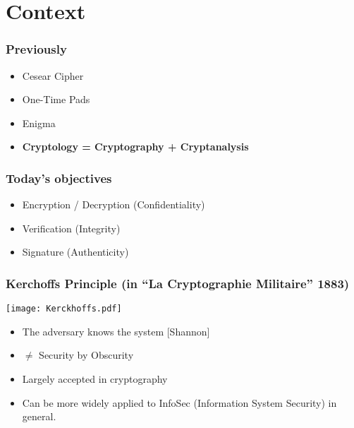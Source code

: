 \documentclass[
hyperref={pdfpagelabels=false}
,xcolor=table
]
{beamer}
\begin{document}
\section{Context}

\begin{frame}
  \frametitle{Previously}
  \begin{itemize}
  \item Cesear Cipher
  \item One-Time Pads 
  \item Enigma
  \item \textbf{Cryptology = Cryptography + Cryptanalysis}
  \end{itemize}
\end{frame}


\begin{frame}
  \frametitle{Today's objectives}
  \begin{itemize}
  \item Encryption / Decryption (Confidentiality)
  \item Verification (Integrity)
  \item Signature (Authenticity)
  \end{itemize}
\end{frame}


\begin{frame}
  \frametitle{Kerchoffs Principle {\normalsize (in ``La Cryptographie Militaire'' 1883)}}
  \begin{center}
    \texttt{[image: Kerckhoffs.pdf]}
  \end{center}
  
  \begin{itemize}
  \item The adversary knows the system [Shannon]
  \item $\ne$ Security by Obscurity
  \item Largely accepted in cryptography
  \item Can be more widely applied to InfoSec (Information System Security) in general. 
  \end{itemize}
\end{frame}
\end{document}
